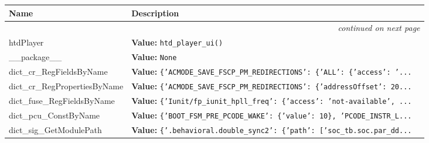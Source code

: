     \vspace{-1cm}
\hspace{\varindent}\begin{longtable}{|p{\varnamewidth}|p{\vardescrwidth}|l}
\cline{1-2}
\cline{1-2} \centering \textbf{Name} & \centering \textbf{Description}& \\
\cline{1-2}
\endhead\cline{1-2}\multicolumn{3}{r}{\small\textit{continued on next page}}\\\endfoot\cline{1-2}
\endlastfoot\raggedright h\-t\-d\-P\-l\-a\-y\-e\-r\- & \raggedright \textbf{Value:} 
{\tt htd\_player\_ui()}&\\
\cline{1-2}
\raggedright \_\-\_\-p\-a\-c\-k\-a\-g\-e\-\_\-\_\- & \raggedright \textbf{Value:} 
{\tt None}&\\
\cline{1-2}
\raggedright d\-i\-c\-t\-\_\-c\-r\-\_\-R\-e\-g\-F\-i\-e\-l\-d\-s\-B\-y\-N\-a\-m\-e\- & \raggedright \textbf{Value:} 
{\tt \texttt{\{}\texttt{'}\texttt{ACMODE\_SAVE\_FSCP\_PM\_REDIRECTIONS}\texttt{'}\texttt{: }\texttt{\{}\texttt{'}\texttt{ALL}\texttt{'}\texttt{: }\texttt{\{}\texttt{'}\texttt{access}\texttt{'}\texttt{: }\texttt{'}\texttt{...}}&\\
\cline{1-2}
\raggedright d\-i\-c\-t\-\_\-c\-r\-\_\-R\-e\-g\-P\-r\-o\-p\-e\-r\-t\-i\-e\-s\-B\-y\-N\-a\-m\-e\- & \raggedright \textbf{Value:} 
{\tt \texttt{\{}\texttt{'}\texttt{ACMODE\_SAVE\_FSCP\_PM\_REDIRECTIONS}\texttt{'}\texttt{: }\texttt{\{}\texttt{'}\texttt{addressOffset}\texttt{'}\texttt{: }20\texttt{...}}&\\
\cline{1-2}
\raggedright d\-i\-c\-t\-\_\-f\-u\-s\-e\-\_\-R\-e\-g\-F\-i\-e\-l\-d\-s\-B\-y\-N\-a\-m\-e\- & \raggedright \textbf{Value:} 
{\tt \texttt{\{}\texttt{'}\texttt{Iunit/fp\_iunit\_hpll\_freq}\texttt{'}\texttt{: }\texttt{\{}\texttt{'}\texttt{access}\texttt{'}\texttt{: }\texttt{'}\texttt{not-available}\texttt{'}\texttt{, }\texttt{...}}&\\
\cline{1-2}
\raggedright d\-i\-c\-t\-\_\-p\-c\-u\-\_\-C\-o\-n\-s\-t\-B\-y\-N\-a\-m\-e\- & \raggedright \textbf{Value:} 
{\tt \texttt{\{}\texttt{'}\texttt{BOOT\_FSM\_PRE\_PCODE\_WAKE}\texttt{'}\texttt{: }\texttt{\{}\texttt{'}\texttt{value}\texttt{'}\texttt{: }10\texttt{\}}\texttt{, }\texttt{'}\texttt{PCODE\_INSTR\_L}\texttt{...}}&\\
\cline{1-2}
\raggedright d\-i\-c\-t\-\_\-s\-i\-g\-\_\-G\-e\-t\-M\-o\-d\-u\-l\-e\-P\-a\-t\-h\- & \raggedright \textbf{Value:} 
{\tt \texttt{\{}\texttt{'}\texttt{.behavioral.double\_sync2}\texttt{'}\texttt{: }\texttt{\{}\texttt{'}\texttt{path}\texttt{'}\texttt{: }\texttt{[}\texttt{'}\texttt{soc\_tb.soc.par\_dd}\texttt{...}}&\\

\end{longtable}
